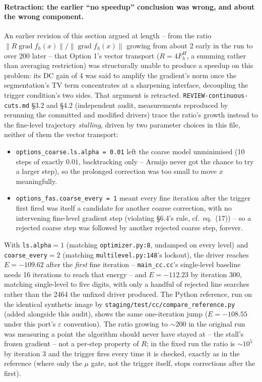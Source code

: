 \documentclass[11pt]{article}
\begin{document}
\paragraph{Retraction: the earlier ``no speedup'' conclusion was wrong, and about the wrong
component.} An earlier revision of this section argued at length -- from the ratio
$\|R\operatorname{grad}f_h(x)\|/\|\operatorname{grad}f_h(x)\|$ growing from about 2 early in
the run to over 200 later -- that Option 1's vector transport ($R=4F_h^H$, a summing rather
than averaging restriction) was structurally unable to produce a speedup on this problem: its
DC gain of 4 was said to amplify the gradient's norm once the segmentation's TV term
concentrates at a sharpening interface, decoupling the trigger condition's two sides. That
argument is retracted. \texttt{REVIEW-continuous-cuts.md} \S3.2 and \S4.2 (independent audit,
measurements reproduced by rerunning the committed and modified drivers) trace the ratio's
growth instead to the fine-level trajectory \emph{stalling}, driven by two parameter choices
in this file, neither of them the vector transport:
\begin{itemize}[nosep]
  \item \texttt{options\_coarse.ls.alpha = 0.01} left the coarse model unminimised (10 steps of
        exactly $0.01$, backtracking only -- Armijo never got the chance to try a larger step),
        so the prolonged correction was too small to move $x$ meaningfully.
  \item \texttt{options\_fas.coarse\_every = 1} meant every fine iteration after the trigger
        first fired was itself a candidate for another coarse correction, with no intervening
        fine-level gradient step (violating \S6.4's rule, cf.\ eq.~(17)) -- so a rejected coarse
        step was followed by another rejected coarse step, forever.
\end{itemize}
With \texttt{ls.alpha}$=1$ (matching \texttt{optimizer.py:8}, undamped on every level) and
\texttt{coarse\_every}$=2$ (matching \texttt{multilevel.py:148}'s lockout), the driver reaches
$E=-109.62$ after the \emph{first} fine iteration -- \texttt{main\_cc.cc}'s single-level
baseline needs 16 iterations to reach that energy -- and $E=-112.23$ by iteration 300,
matching single-level to five digits, with only a handful of rejected line searches rather
than the 2464 the unfixed driver produced. The Python reference, run on the identical
synthetic image by \texttt{staging/test/cc/compare\_reference.py} (added alongside this audit), shows
the same one-iteration jump ($E=-108.55$ under this port's $\varepsilon$ convention). The
ratio growing to $\sim\!200$ in the original run was measuring a point the algorithm should
never have stayed at -- the stall's frozen gradient -- not a per-step property of $R$; in the
fixed run the ratio is $\sim\!10^5$ by iteration 3 and the trigger fires every time it is
checked, exactly as in the reference (where only the $\mu$ gate, not the trigger itself, stops
corrections after the first).
\end{document}
